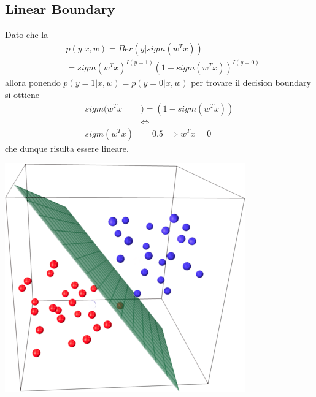 \documentclass[a4paper,8pt]{article}
\newenvironment{Figure}
  {\par\medskip\noindent\minipage{\linewidth}}
  {\endminipage\par\medskip}
\begin{document}
\begin{multicols}{2}
\subsection{Linear Boundary}
Dato che la
\begin{equation}
\begin{split}
&p(y|x,w) = Ber(y|sigm(w^Tx))\\
&=sigm(w^Tx)^{I(y=1)}(1-sigm(w^Tx))^{I(y=0)}
\end{split}
\end{equation}
allora ponendo $p(y=1|x,w) = p(y=0|x,w)$ per trovare il decision boundary si ottiene 
\begin{equation}
\begin{split}
sigm(w^Tx&)=(1-sigm(w^Tx)) \\
&\iff \\
sigm(w^Tx)&= 0.5 \implies w^Tx = 0
\end{split}
\end{equation}
che dunque risulta essere lineare.
\begin{Figure}
 \centering
 \includegraphics[width=\linewidth]{logL}
\end{Figure}



\end{multicols}
\end{document}
